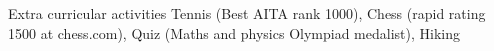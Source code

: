 \documentclass{resume} %
\begin{document}
\begin{rSection}{Extra curricular activities}
Tennis (Best AITA rank 1000), Chess (rapid rating 1500 at chess.com), Quiz (Maths and physics Olympiad medalist), Hiking

\end{rSection}





\end{document}
